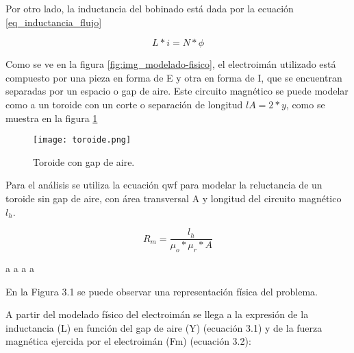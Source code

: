 Por otro lado, la inductancia del bobinado está dada por la ecuación \ref{eq_inductancia_flujo}

\begin{equation} \label{eq_inductancia_flujo}
	L*i=N*\phi
\end{equation}


Como se ve en la figura \ref{fig:img_modelado-fisico}, el electroimán utilizado está compuesto por una pieza en forma de E y otra en forma de I, que se encuentran separadas por un espacio o gap de aire. Este circuito magnético se puede modelar como a un toroide con un corte o separación  de longitud $lA=2*y$, como se muestra en la figura \ref{fig:img_toroide}

\begin{figure}[H]
	\centering
	\texttt{[image: toroide.png]}
	\caption{Toroide con gap de aire.}
	\label{fig:img_toroide}
\end{figure}

Para el análisis se utiliza la ecuación qwf para modelar la reluctancia de un toroide sin gap de aire, con área transversal A y longitud del circuito magnético $l_{h}$. 

\begin{equation}\label{eq_reluctancia}
	R_{m}=\frac{l_{h}}{\mu_{o}*\mu_{r}*A}
\end{equation}

a
a
a
a


En la Figura 3.1 se puede observar una representación física del problema.


A partir del modelado físico del electroimán se llega a la expresión de la inductancia (L) en función del gap de aire (Y) (ecuación 3.1) y de la fuerza magnética ejercida por el electroimán (Fm) (ecuación 3.2):


